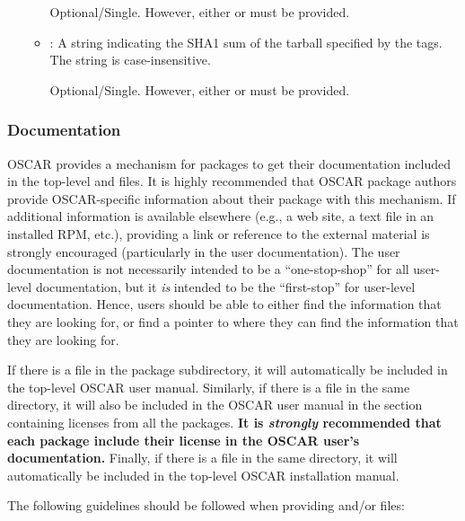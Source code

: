 \begin{itemize}
\begin{itemize}
    Optional/Single.  However, either  or
     must be provided.
    
  \item {}: A string indicating the SHA1 sum of the
    tarball specified by the  tags.  The string is
    case-insensitive.
    
    Optional/Single.  However, either  or
     must be provided.
  \end{itemize}
\end{itemize}

\endchange


\subsubsection{Documentation}
\label{sec:design-pkg-docs}

OSCAR provides a mechanism for packages to get their documentation
included in the top-level  and 
files.  It is highly recommended that OSCAR package authors provide
OSCAR-specific information about their package with this mechanism.
If additional information is available elsewhere (e.g., a web site, a
text file in an installed RPM, etc.), providing a link or reference to
the external material is strongly encouraged (particularly in the user
documentation).  The user documentation is not necessarily intended to
be a ``one-stop-shop'' for all user-level documentation, but it {\em
  is} intended to be the ``first-stop'' for user-level documentation.
Hence, users should be able to either find the information that they
are looking for, or find a pointer to where they can find the
information that they are looking for.

If there is a file  in the  package
subdirectory, it will automatically be included in the top-level OSCAR
user manual.  
%
Similarly, if there is a file  in the same
directory, it will also be included in the OSCAR user manual in the
section containing licenses from all the packages.  {\bf It is {\em
    strongly} recommended that each package include their license in
  the OSCAR user's documentation.}
%
Finally, if there is a file  in the same directory,
it will automatically be included in the top-level OSCAR installation
manual.  

The following guidelines should be followed when providing
 and/or  files:

